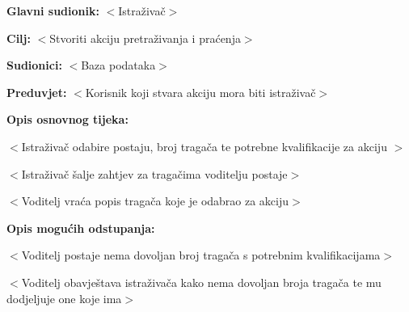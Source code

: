 					
					\noindent {}
					\begin{packed_item}
						
						\item \textbf{Glavni sudionik: }$<$Istraživač$>$
						\item  \textbf{Cilj:} $<$Stvoriti akciju pretraživanja i praćenja$>$
						\item  \textbf{Sudionici:} $<$Baza podataka$>$
						\item  \textbf{Preduvjet:} $<$Korisnik koji stvara akciju mora biti istraživač$>$
						\item  \textbf{Opis osnovnog tijeka:}
						
						\item[] \begin{packed_enum}
							
							\item $<$Istraživač odabire postaju, broj tragača te potrebne kvalifikacije za akciju $>$
							\item $<$Istraživač šalje zahtjev za tragačima voditelju postaje$>$
							\item $<$Voditelj vraća popis tragača koje je odabrao za akciju$>$
							
							
						\end{packed_enum}
						
					\end{packed_item}
					
					\item  \textbf{Opis mogućih odstupanja:}
					
					\item[] \begin{packed_item}
						
						\item[3.a] $<$Voditelj postaje nema dovoljan broj tragača s potrebnim kvalifikacijama$>$
						\item[] \begin{packed_enum}
							
							\item $<$Voditelj obavještava istraživača kako nema dovoljan broja tragača te mu dodjeljuje one koje ima$>$
							
						\end{packed_enum}
						
					\end{packed_item}
					
					
					
